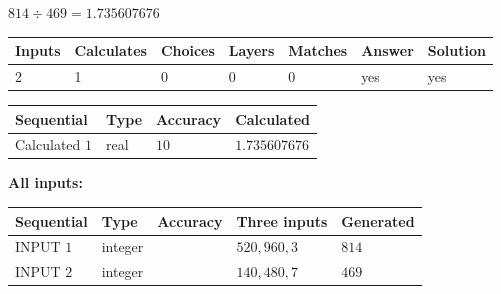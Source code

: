 \documentclass{ctexart}
\begin{document}
 

 
 
 
\noindent{}
 
 

$ %
814 \div  %
469=   %
1.735607676$
 
 
\noindent{}
 
 

 
   
   
   
   
\noindent\begin{tabular}{|l|l|l|l|l|l|l|}
 \hline
Inputs & Calculates & Choices & Layers & Matches & Answer & Solution \\ \hline
 2  & 
 1  & 
 0
  & 
 0  & 
 0  & 
  yes & 
  yes 
  \\ \hline
 \end{tabular}
   
   
   
   
\noindent{}
   
   
  
  
\noindent\begin{tabular}{|l|l|l|l|}
\hline
 Sequential & Type & Accuracy & Calculated \\ 
\hline
 
 
  Calculated $  1 $ & real & $  10  $ & 
 $ 1.735607676 $ 
 \\  \hline  
 \end{tabular}
   
   
   
   
\noindent\vspace{0.1in}\hspace{-0.08in} {\textbf{\Large{All inputs: }}}
   
   
  
  
\noindent\begin{tabular}{|l|l|l|l|l|}
\hline
 Sequential & Type & Accuracy & Three inputs & Generated \\ 
\hline
 
 
  INPUT $  1 $ & integer &  & $
 520
 , 
 960
 , 
 3
 $ & $ 814 $ 
 \\  \hline  
 
 
  INPUT $  2 $ & integer &  & $
 140
 , 
 480
 , 
 7
 $ & $ 469 $ 
 \\  \hline  
 \end{tabular}
   
\end{document}
